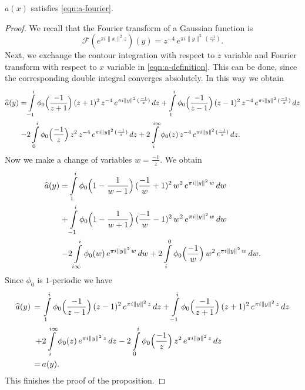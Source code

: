 \begin{proposition}\label{prop:a-fourier}
$a(x)$ satisfies \eqref{eqn:a-fourier}.
\end{proposition}
\begin{proof}
We recall that the Fourier transform of a Gaussian function is
\begin{equation}\label{eqn:gaussian Fourier}
    \mathcal{F}(e^{\pi i \|x\|^2 z})(y)=z^{-4}\,e^{\pi i \|y\|^2 \,(\frac{-1}{z}) }.
\end{equation}
Next, we exchange the contour integration with respect to $z$ variable and Fourier transform    with respect to $x$ variable in \eqref{eqn:a-definition}. This can be done, since the corresponding double integral converges absolutely. In this way we obtain
\begin{align}
    \widehat{a}(y)=&\int\limits_{-1}^i\phi_0\Big(\frac{-1}{z+1}\Big)\,(z+1)^2\,z^{-4}\,e^{\pi i \|y\|^2 \,(\frac{-1}{z})}\,dz
    +\int\limits_{1}^i\phi_0\Big(\frac{-1}{z-1}\Big)\,(z-1)^2\,z^{-4}\,e^{\pi i \|y\|^2 \,(\frac{-1}{z})}\,dz\notag \\
    -&2\int\limits_{0}^i\phi_0\Big(\frac{-1}{z}\Big)\,z^2\,z^{-4}\,e^{\pi i \|y\|^2 \,(\frac{-1}{z})}\,dz +2\int\limits_{i}^{i\infty}\phi_0(z)\,z^{-4}\,e^{\pi i \|y\|^2 \,(\frac{-1}{z})}\,dz.\notag
\end{align}
Now we make a change of variables $w=\frac{-1}{z}$. We obtain
\begin{align}
    \widehat{a}(y)=&\int\limits_{1}^i\phi_0\Big(1-\frac{1}{w-1}\Big)\,(\frac{-1}{w}+1)^2\,w^{2}\,e^{\pi i \|y\|^2 \,w}\,dw\notag\\
    +&\int\limits_{-1}^i\phi_0\Big(1-\frac{1}{w+1}\Big)\,(\frac{-1}{w}-1)^2\,w^2\,e^{\pi i \|y\|^2 \,w}\,dw\\
    -&2\int\limits_{i \infty}^i\phi_0(w)\,e^{\pi i \|y\|^2 \,w}\,dw +2\int\limits_{i}^{0}\phi_0\Big(\frac{-1}{w}\Big)\,w^{2}\,e^{\pi i \|y\|^2 \,w}\,dw.\notag
\end{align}
Since $\phi_0$ is $1$-periodic we have
\begin{align}
    \widehat{a}(y)\,=\,&\int\limits_{1}^i\phi_0\Big(\frac{-1}{z-1}\Big)\,(z-1)^2\,e^{\pi i \|y\|^2 \,z}\,dz
    +\int\limits_{-1}^i\phi_0\Big(\frac{-1}{z+1}\Big)\,(z+1)^2\,e^{\pi i \|y\|^2 \,z}\,dz\notag \\
    +&2\int\limits_{i}^{i\infty}\phi_0(z)\,e^{\pi i \|y\|^2 \,z}\,dz
    -2\int\limits_{0}^{i}\phi_0\Big(\frac{-1}{z}\Big)\,z^{2}\,e^{\pi i \|y\|^2 \,z}\,dz\notag \\
    \,=\,&a(y).
\end{align}
This finishes the proof of the proposition.
\end{proof}

